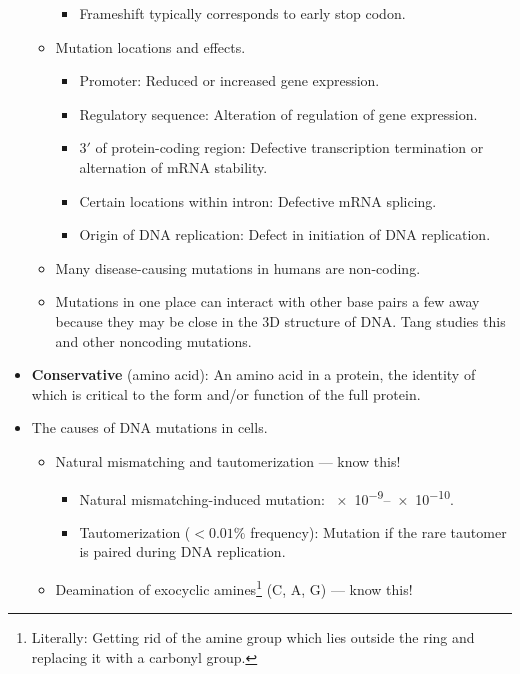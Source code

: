 \documentclass[../notes.tex]{subfiles}
\begin{document}
\begin{itemize}
\begin{itemize}
        \begin{itemize}
            \item Frameshift typically corresponds to early stop codon.
        \end{itemize}
        \item Mutation locations and effects.
        \begin{itemize}
            \item Promoter: Reduced or increased gene expression.
            \item Regulatory sequence: Alteration of regulation of gene expression.
            \item $3'$ of protein-coding region: Defective transcription termination or alternation of mRNA stability.
            \item Certain locations within intron: Defective mRNA splicing.
            \item Origin of DNA replication: Defect in initiation of DNA replication.
        \end{itemize}
        \item Many disease-causing mutations in humans are non-coding.
        \item Mutations in one place can interact with other base pairs a few away because they may be close in the 3D structure of DNA. Tang studies this and other noncoding mutations.
    \end{itemize}
    \item \textbf{Conservative} (amino acid): An amino acid in a protein, the identity of which is critical to the form and/or function of the full protein.
    \item The causes of DNA mutations in cells.
    \begin{itemize}
        \item Natural mismatching and tautomerization --- know this!
        \begin{itemize}
            \item Natural mismatching-induced mutation: \numrange{e-9}{e-10}.
            \item Tautomerization ($<0.01\%$ frequency): Mutation if the rare tautomer is paired during DNA replication.
        \end{itemize}
        \item Deamination of exocyclic amines\footnote{Literally: Getting rid of the amine group which lies outside the ring and replacing it with a carbonyl group.} (C, A, G) --- know this!
        \begin{itemize}

\end{itemize}
\end{itemize}
\end{itemize}
\end{document}
